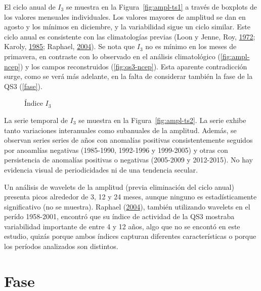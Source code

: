 \documentclass[spanish,a4paper,12pt,oneside]{book}
\begin{document}
El ciclo anual de \(I_3\) se muestra en la Figura~\ref{fig:ampl-ts1} a
través de boxplots de los valores mensuales individuales. Los valores
mayores de amplitud se dan en agosto y los mínimos en diciembre, y la
variabilidad sigue un ciclo similar. Este ciclo anual es consistente con
las climatologías previas (Loon y Jenne, Roy,
\protect\hyperlink{ref-Loon1972}{1972}; Karoly,
\protect\hyperlink{ref-Karoly1985}{1985}; Raphael,
\protect\hyperlink{ref-Raphael2004}{2004}). Se nota que \(I_3\) no es
mínimo en los meses de primavera, en contraste con lo observado en el
análisis climatológico (\autoref{fig:ampl-ncep}) y los campos
reconstruidos (\autoref{fig:qs3-ncep}). Esta aparente contradicción
surge, como se verá más adelante, en la falta de considerar también la
fase de la QS3 (\autoref{fase}).

\begin{figure}
\newline{}\caption{Índice $I_3$}\label{fig:ampl-ts}
\end{figure}

La serie temporal de \(I_3\) se muestra en la Figura~\ref{fig:ampl-ts2}.
La serie exhibe tanto variaciones interanuales como subanuales de la
amplitud. Además, se observan series series de años con anomalías
positivas consistentemente seguidos por anoamlías negativas (1985-1990,
1992-1996 y 1999-2005) y otras con persistencia de anomalías positivas o
negativas (2005-2009 y 2012-2015). No hay evidencia visual de
periodicidades ni de una tendencia secular.

Un análisis de wavelets de la amplitud (previa eliminación del ciclo
anual) presenta picos alrededor de 3, 12 y 24 meses, aunque ninguno es
estadísticamente significativo (no se muestra). Raphael
(\protect\hyperlink{ref-Raphael2004}{2004}), también utilizando wavelets
en el perído 1958-2001, encontró que su índice de actividad de la QS3
mostraba variabilidad importante de entre 4 y 12 años, algo que no se
encontó en este estudio, quizás porque ambos índices capturan diferentes
características o porque los períodos analizados son distintos.

\section{Fase}\label{fase}
\end{document}
